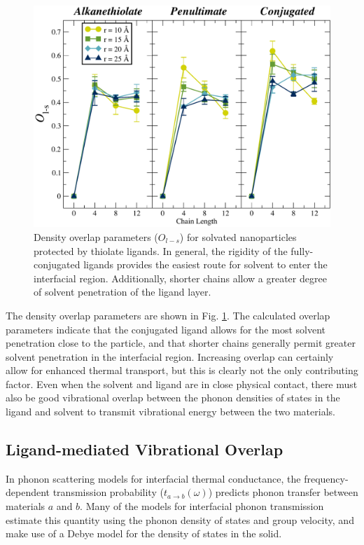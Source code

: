 \documentclass[aps,jcp,preprint,showpacs,superscriptaddress,groupedaddress]{revtex4-1}  %
\begin{document}
\begin{figure}
  \includegraphics[width=\linewidth]{figures/rho3}
  \caption{Density overlap parameters ($O_{l-s}$) for solvated
    nanoparticles protected by thiolate ligands. In general, the
    rigidity of the fully-conjugated ligands provides the easiest
    route for solvent to enter the interfacial region. Additionally,
    shorter chains allow a greater degree of solvent penetration of
    the ligand layer.}
  \label{fig:rho3}
\end{figure}

The density overlap parameters are shown in Fig. \ref{fig:rho3}.  The
calculated overlap parameters indicate that the conjugated ligand
allows for the most solvent penetration close to the particle, and
that shorter chains generally permit greater solvent penetration in
the interfacial region. Increasing overlap can certainly allow for
enhanced thermal transport, but this is clearly not the only
contributing factor. Even when the solvent and ligand are in close
physical contact, there must also be good vibrational overlap between
the phonon densities of states in the ligand and solvent to transmit
vibrational energy between the two materials.

\subsection{Ligand-mediated Vibrational Overlap}

In phonon scattering models for interfacial thermal
conductance,\cite{Swartz:1989uq,Young:1989xy,Cahill:2003fk,Reddy:2005fk,Schmidt:2010nr}
the frequency-dependent transmission probability
($t_{a \rightarrow b}(\omega)$) predicts phonon transfer between
materials $a$ and $b$.  Many of the models for interfacial phonon
transmission estimate this quantity using the phonon density of states
and group velocity, and make use of a Debye model for the density of
states in the solid.
\end{document}
